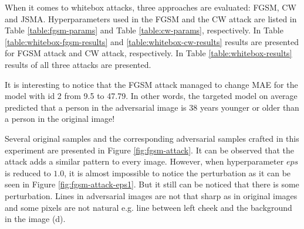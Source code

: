 When it comes to whitebox attacks, three approaches are evaluated: FGSM, CW and JSMA. Hyperparameters used in the FGSM and the CW attack are listed in Table \ref{table:fgsm-params} and Table \ref{table:cw-params}, respectively. In Table \ref{table:whitebox-fgsm-results} and \ref{table:whitebox-cw-results} results are presented for FGSM attack and CW attack, respectively. In Table \ref{table:whitebox-results} results of all three attacks are presented.

It is interesting to notice that the FGSM attack managed to change MAE for the model with id 2 from 9.5 to 47.79. In other words, the targeted model on average predicted that a person in the adversarial image is 38 years younger or older than a person in the original image! 

Several original samples and the corresponding adversarial samples crafted in this experiment are presented in Figure \ref{fig:fgsm-attack}. It can be observed that the attack adds a similar pattern to every image. However, when hyperparameter $eps$ is reduced to $1.0$, it is almost impossible to notice the perturbation as it can be seen in Figure \ref{fig:fgsm-attack-eps1}. But it still can be noticed that there is some perturbation. Lines in adversarial images are not that sharp as in original images and some pixels are not natural e.g. line between left cheek and the background in the image (d).


